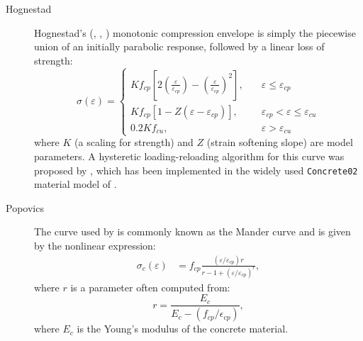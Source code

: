 \begin{description}
\item[Hognestad]
  Hognestad's (\citet{hognestad1951study}, \citet{kent1973cyclic}, \textcite{scott1982stressstrain}) monotonic
  compression envelope is simply the piecewise union of an initially parabolic response, followed by a linear loss of strength: 
  \begin{equation}
  \sigma(\varepsilon)=\left\{\begin{aligned}
  K f_{cp}\left[2\left(\frac{\varepsilon}{\varepsilon_{cp}}\right)-\left(\frac{\varepsilon}{\varepsilon_{cp}}\right)^{2}\right], &\quad \varepsilon \leq \varepsilon_{cp} \\
  K f_{cp}\left[1-Z\left(\varepsilon-\varepsilon_{cp}\right)\right], &\quad \varepsilon_{cp}<\varepsilon \leq \varepsilon_{cu} \\
  0.2 K f_{cu}, &\quad \varepsilon > \varepsilon_{cu}
  \end{aligned}\right.
  \label{eq:hognestad}
  \end{equation}
  where $K$ (a scaling for strength) and $Z$ (strain softening slope) are model parameters. A hysteretic loading-reloading algorithm for this curve was proposed by \citet{yassin1994nonlinear}, which has been implemented in the widely used \texttt{Concrete02} material model of \OpenSees{}.
%
\item[Popovics] The curve used by \cite{popov1978cyclic} is commonly known as the Mander curve and is given by the nonlinear expression: 
  \begin{equation}
\begin{aligned}
\sigma_c(\varepsilon) &= f_{cp}\frac{(\varepsilon/\varepsilon_{cp})r}{r-1+(\varepsilon/\varepsilon_{cp})^r},
\end{aligned}
  \label{eq:popovics}
\end{equation}
where $r$ is a parameter often computed from:
\begin{equation}
r =\frac{E_{c}}{E_{c}-\left(f_{c p} / \epsilon_{c p}\right)},
\label{eq:popovics1}
\end{equation}
where $E_c$ is the Young's modulus of the concrete material. 

\end{description}


